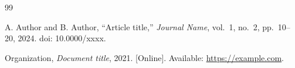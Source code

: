 
\begin{thebibliography}{99}

A. Author and B. Author, ``Article title,'' \emph{Journal Name}, vol.~1, no.~2,
pp.~10--20, 2024. doi: 10.0000/xxxx.

Organization, \emph{Document title}, 2021. [Online]. Available:
\url{https://example.com}.

\end{thebibliography}
